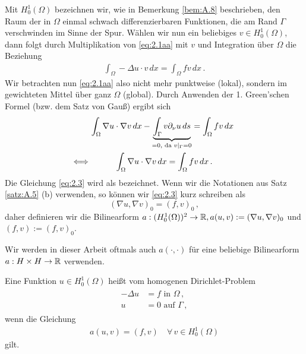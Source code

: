 Mit $H^1_0 (\Omega)$ bezeichnen wir, wie in Bemerkung \ref{bem:A.8} beschrieben, den Raum der in $\Omega$ einmal schwach differenzierbaren Funktionen, die am Rand $\Gamma$ verschwinden im Sinne der Spur. Wählen wir nun ein beliebiges $v \in H^1_0(\Omega)$, dann folgt durch Multiplikation von \eqref{eq:2.1aa} mit $v$ und Integration über $\Omega$ die Beziehung
\begin{align*}
	\int_\Omega -\Delta u \cdot v \, dx = \int_\Omega f v \, dx \, .
\end{align*}
Wir betrachten nun \eqref{eq:2.1aa} also nicht mehr punktweise (lokal), sondern im gewichteten Mittel über ganz $\Omega$ (global). Durch Anwenden der 1. Green'schen Formel (bzw. dem Satz von Gauß) ergibt sich
\begin{align}\notag
	& \int_\Omega \nabla u \cdot \nabla v \, dx -\underbrace{\int_\Gamma v \partial_\nu u \, ds}_{=0, \text{ da } v|_\Gamma = 0} = \int_\Omega f v \, dx \, \\
	\label{eq:2.3}	
	\Longleftrightarrow \, & \quad \qquad \int_\Omega \nabla u \cdot \nabla v \, dx =\int_\Omega f v \, dx \, .
\end{align}
Die Gleichung \eqref{eq:2.3} wird als \textit{} bezeichnet. Wenn wir die Notationen aus Satz \ref{satz:A.5} (b) verwenden, so können wir \eqref{eq:2.3} kurz schreiben als
\[
	(\nabla u, \nabla v)_0 = (f,v)_0 \, ,
\]
daher definieren wir die Bilinearform $a: (H^1_0(\Omega))^2 \rightarrow \mathbb{R}, a(u,v) := (\nabla u, \nabla v)_0$ und $(f,v):=(f,v)_0$.


\begin{bem*}
Wir werden in dieser Arbeit oftmals auch $a(\cdot,\cdot)$ für eine beliebige Bilinearform $a: H\times H\rightarrow \mathbb{R}$ verwenden.
\end{bem*}


\begin{defi}\label{def:2.8}
Eine Funktion $u \in H^1_0(\Omega)$ heißt \textit{} vom homogenen Dirichlet-Problem
\begin{align}\label{eq:DP}\tag{DP}
\begin{aligned}
	-\Delta  u &=  f \text{ in } \Omega \, ,\\
	 u & = 0 \text{ auf } \Gamma \, ,
\end{aligned}
\end{align}
wenn die Gleichung
\begin{align}\label{eq:2.4}
	a(u,v) = (f,v)\quad \forall \, v \in H^1_0(\Omega) 
\end{align}
gilt.
\end{defi}


